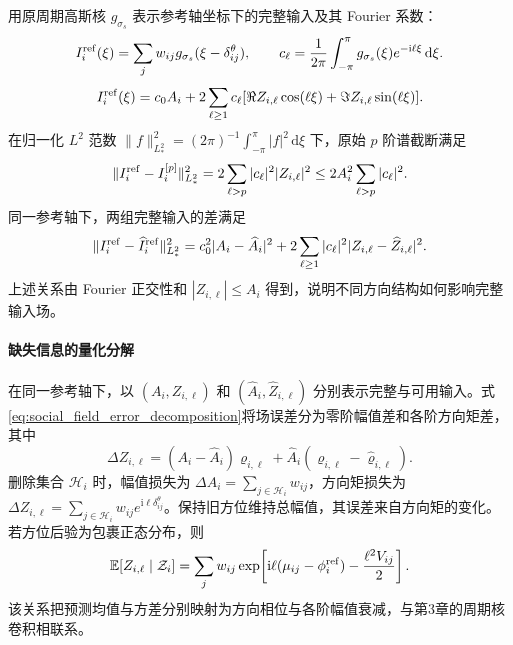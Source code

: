 \documentclass[UTF8,fontset=windows,11pt]{ctexart}
\begin{document}
用原周期高斯核 $g_{\sigma_s}$ 表示参考轴坐标下的完整输入及其 Fourier 系数：
\begin{equation}
 I_i^{\rm ref}(\xi)=\sum_jw_{ij}g_{\sigma_s}(\xi-\delta^\theta_{ij}),\qquad
 c_\ell=\frac1{2\pi}\int_{-\pi}^{\pi}g_{\sigma_s}(\xi)e^{-\mathrm i\ell\xi}\,\mathrm d\xi.
 \label{eq:social_field_fourier_coefficients}
\end{equation}
\begin{equation}
 I_i^{\rm ref}(\xi)=c_0A_i+2\sum_{\ell\ge1}c_\ell
 [\Re Z_{i,\ell}\cos(\ell\xi)+\Im Z_{i,\ell}\sin(\ell\xi)].
 \label{eq:social_field_moment_expansion}
\end{equation}
在归一化 $L^2$ 范数 $\|f\|_{L^2_*}^2=(2\pi)^{-1}\int_{-\pi}^{\pi}|f|^2\,\mathrm d\xi$ 下，原始 $p$ 阶谱截断满足
\begin{equation}
 \|I_i^{\rm ref}-I_i^{[p]}\|_{L^2_*}^2
 =2\sum_{\ell>p}|c_\ell|^2|Z_{i,\ell}|^2
 \le2A_i^2\sum_{\ell>p}|c_\ell|^2.
 \label{eq:social_field_parseval_tail}
\end{equation}
同一参考轴下，两组完整输入的差满足
\begin{equation}
 \|I_i^{\rm ref}-\widehat I_i^{\rm ref}\|_{L^2_*}^2
 =c_0^2|A_i-\widehat A_i|^2+2\sum_{\ell\ge1}|c_\ell|^2|Z_{i,\ell}-\widehat Z_{i,\ell}|^2.
 \label{eq:social_field_error_decomposition}
\end{equation}
上述关系由 Fourier 正交性和 $|Z_{i,\ell}|\le A_i$ 得到，说明不同方向结构如何影响完整输入场。


\paragraph{缺失信息的量化分解}
在同一参考轴下，以 $(A_i,Z_{i,\ell})$ 和 $(\widehat A_i,\widehat Z_{i,\ell})$ 分别表示完整与可用输入。式\eqref{eq:social_field_error_decomposition}将场误差分为零阶幅值差和各阶方向矩差，其中
\begin{equation}
 \Delta Z_{i,\ell}=(A_i-\widehat A_i)\varrho_{i,\ell}
 +\widehat A_i(\varrho_{i,\ell}-\widehat\varrho_{i,\ell}).
 \label{eq:missing_input_decomposition}
\end{equation}
删除集合 $\mathcal H_i$ 时，幅值损失为 $\Delta A_i=\sum_{j\in\mathcal H_i}w_{ij}$，方向矩损失为 $\Delta Z_{i,\ell}=\sum_{j\in\mathcal H_i}w_{ij}e^{\mathrm i\ell\delta^\theta_{ij}}$。保持旧方位维持总幅值，其误差来自方向矩的变化。若方位后验为包裹正态分布，则
\begin{equation}
 \mathbb E[Z_{i,\ell}\mid\mathcal Z_i]
 =\sum_jw_{ij}\exp\!\left[\mathrm i\ell(\mu_{ij}-\phi_i^{\rm ref})-\frac{\ell^2V_{ij}}2\right].
\end{equation}
该关系把预测均值与方差分别映射为方向相位与各阶幅值衰减，与第3章的周期核卷积相联系。
\end{document}
